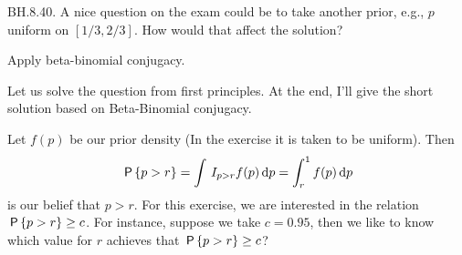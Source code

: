 \begin{exercise}
BH.8.40. A nice question on the exam could be to take another prior, e.g., $p$ uniform on $[1/3, 2/3]$. How would that affect the solution?
\begin{hint}
Apply beta-binomial conjugacy.
\end{hint}
\begin{solution}
Let us solve the question from first principles. At the end, I'll give the short solution based on Beta-Binomial conjugacy.

Let $f(p)$ be our prior density (In the exercise it is taken to be uniform). Then
\begin{align*}
\P{p>r}=\int \1{p>r}f(p) \d p = \int_{r}^{1} f(p) \d p
\end{align*}
is our belief that $p>r$. For this exercise, we are interested in the relation $\P{p>r} \geq c$. For instance, suppose we take $c=0.95$, then we like to know which value for $r$ achieves that $\P{p>r} \geq c$?


\end{solution}
\end{exercise}
